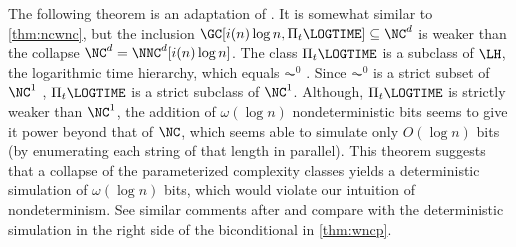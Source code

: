 The following theorem is an adaptation of \autocite[Theorem~4.3]{cc97npo}.
It is somewhat similar to \autoref{thm:ncwnc}, but the inclusion $\GC[i(n) \log n, \Pi_t \LOGTIME] \subseteq \NC^d$ is weaker than the collapse $\NC^d = \NNC^d[i(n) \log n]$.
The class $\Pi_t \LOGTIME$ is a subclass of $\LH$, the logarithmic time hierarchy, which equals $\AC^0$ \autocite[Corollary~5.32]{immerman99}.
Since $\AC^0$ is a strict subset of $\NC^1$ \autocite{fss84}, $\Pi_t \LOGTIME$ is a strict subclass of $\NC^1$.
Although, $\Pi_t \LOGTIME$ is strictly weaker than $\NC^1$, the addition of $\omega(\log n)$ nondeterministic bits seems to give it power beyond that of $\NC$, which seems able to simulate only $O(\log n)$ bits (by enumerating each string of that length in parallel).
This theorem suggests that a collapse of the parameterized complexity classes yields a deterministic simulation of $\omega(\log n)$ bits, which would violate our intuition of nondeterminism.
See similar comments after \autocite[Theorem~4.3]{cc97npo} and compare with the deterministic simulation in the right side of the biconditional in \autoref{thm:wncp}.

